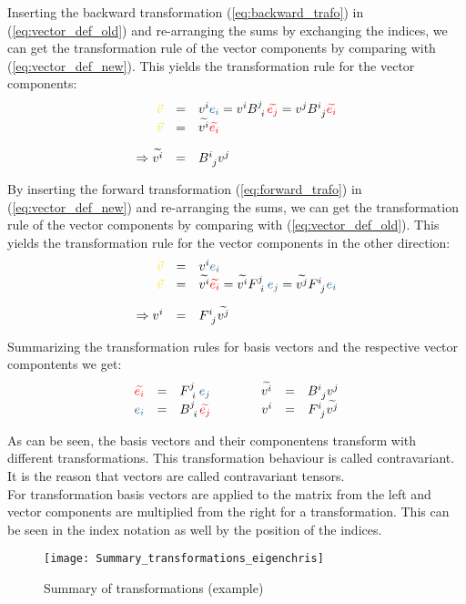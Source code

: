 Inserting the backward transformation (\ref{eq:backward_trafo}) in
(\ref{eq:vector_def_old}) and re-arranging the sums by exchanging the indices, we can get
the transformation rule of the vector components by comparing with
(\ref{eq:vector_def_new}). This yields the transformation rule for the vector components:
\begin{equation}
  \label{eq:vector_trafo_to_new}
  \begin{array}{rcl}
    \hdv & = & \hdvc{i} \hdbvc{i}
    = \hdvc{i} B^{j~}_{~i} \hdbtvc{j}
    = \hdvc{j} B^{i~}_{~j} \hdbtvc{i} \\
    \hdv & = & \hdtvc{i} \hdbtvc{i}
    \\ \noalign{\vskip10pt}
    \Rightarrow \hdtvc{i} & = & B^{i~}_{~j} \hdvc{j}
  \end{array}
\end{equation}

By inserting the forward transformation (\ref{eq:forward_trafo}) in
(\ref{eq:vector_def_new}) and re-arranging the sums, we can get the transformation rule of
the vector components by comparing with (\ref{eq:vector_def_old}). This yields the
transformation rule for the vector components in the other direction:
\begin{equation}
  \label{eq:vector_trafo_to_old}
  \begin{array}{rcl}
    \hdv & = & \hdvc{i} \hdbvc{i} \\
    \hdv & = & \hdtvc{i} \hdbtvc{i}
    = \hdtvc{i} F^{j~}_{~i}\hdbvc{j}
    = \hdtvc{j} F^{i~}_{~j}\hdbvc{i}\\
    \noalign{\vskip10pt}
    \Rightarrow \hdvc{i} & = &  F^{i~}_{~j} \hdtvc{j}
  \end{array}
\end{equation}

Summarizing the transformation rules for basis vectors and the respective vector
compontents we get:
\begin{equation}
  \label{eq:vector_trafo_overview}
  \begin{array}{rclrcl}
    \hdbtvc{i} & = &
    F^{j~}_{~i}\hdbvc{j} \qquad\qquad
    \hdtvc{i} & = & B^{i~}_{~j} \hdvc{j} \\
    \hdbvc{i} & = &
    B^{j~}_{~i}\hdbtvc{j} \qquad\qquad
    \hdvc{i} & = &  F^{i~}_{~j} \hdtvc{j}
  \end{array}
\end{equation}

As can be seen, the basis vectors and their componentens transform with different
transformations. This transformation behaviour is called contravariant. It is the reason
that vectors are called contravariant tensors. \\

For transformation basis vectors are applied to the matrix from the left and vector
components are multiplied from the right for a transformation. This can be seen in the
index notation as well by the position of the indices.
\begin{figure}[h]
  \centering
  \texttt{[image: Summary\_transformations\_eigenchris]}
  \caption{Summary of transformations (example)}
  \label{fig:transformation_summary_example}
\end{figure}

\newpage